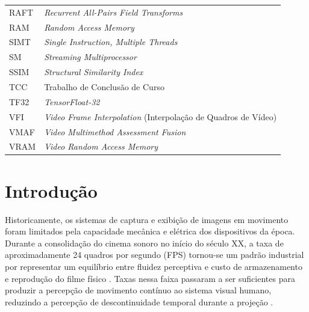 \documentclass[
    12pt,                %
    openright,           %
    oneside,             %
    a4paper,             %
    english,             %
    brazil               %
]{abntex2}
\begin{document}
\begin{table}[htb]
\begin{tabularx}{\textwidth}{@{}p{5.0cm}Y@{}}
RAFT  & \textit{Recurrent All-Pairs Field Transforms} \\
RAM   & \textit{Random Access Memory} \\
SIMT  & \textit{Single Instruction, Multiple Threads} \\
SM    & \textit{Streaming Multiprocessor} \\
SSIM  & \textit{Structural Similarity Index} \\
TCC   & Trabalho de Conclusão de Curso \\
TF32  & \textit{TensorFloat-32} \\
VFI  & \textit{Video Frame Interpolation} (Interpolação de Quadros de Vídeo) \\
VMAF  & \textit{Video Multimethod Assessment Fusion} \\
VRAM  & \textit{Video Random Access Memory} \\
\bottomrule
\end{tabularx}
\end{table}

\cleardoublepage

\tableofcontents
\cleardoublepage

\textual


\chapter{Introdução}
\label{cap:introducao}

Historicamente, os sistemas de captura e exibição de imagens em movimento foram limitados pela capacidade mecânica e elétrica dos dispositivos da época. Durante a consolidação do cinema sonoro no início do século XX, a taxa de aproximadamente 24 quadros por segundo (FPS) tornou-se um padrão industrial por representar um equilíbrio entre fluidez perceptiva e custo de armazenamento e reprodução do filme físico \cite{Bordwell2016}. Taxas nessa faixa passaram a ser suficientes para produzir a percepção de movimento contínuo ao sistema visual humano, reduzindo a percepção de descontinuidade temporal durante a projeção \cite{Watkinson2009}.
\end{document}
